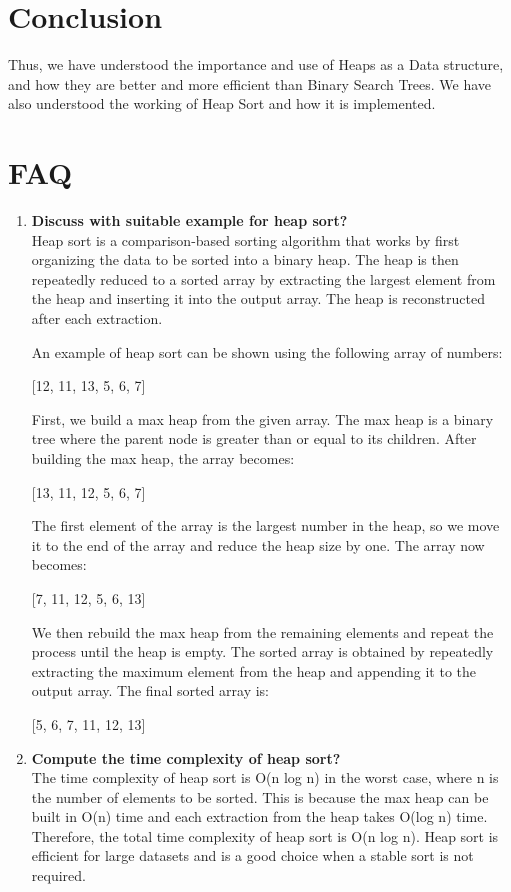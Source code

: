 \documentclass[11pt]{article}
\begin{document}


\section{Conclusion}
Thus, we have understood the importance and use of Heaps as a Data structure, and how they are better and more efficient than Binary Search Trees. We have also understood the working of Heap Sort and how it is implemented.

\clearpage

\section{FAQ}
\begin{enumerate}
    \item \textbf{Discuss with suitable example for heap sort?}\\
          Heap sort is a comparison-based sorting algorithm that works by first organizing the data to be sorted into a binary heap. The heap is then repeatedly reduced to a sorted array by extracting the largest element from the heap and inserting it into the output array. The heap is reconstructed after each extraction.

          An example of heap sort can be shown using the following array of numbers:

          [12, 11, 13, 5, 6, 7]

          First, we build a max heap from the given array. The max heap is a binary tree where the parent node is greater than or equal to its children. After building the max heap, the array becomes:

          [13, 11, 12, 5, 6, 7]

          The first element of the array is the largest number in the heap, so we move it to the end of the array and reduce the heap size by one. The array now becomes:

          [7, 11, 12, 5, 6, 13]

          We then rebuild the max heap from the remaining elements and repeat the process until the heap is empty. The sorted array is obtained by repeatedly extracting the maximum element from the heap and appending it to the output array. The final sorted array is:

          [5, 6, 7, 11, 12, 13]


    \item \textbf{Compute the time complexity of heap sort?}\\
          The time complexity of heap sort is O(n log n) in the worst case, where n is the number of elements to be sorted. This is because the max heap can be built in O(n) time and each extraction from the heap takes O(log n) time. Therefore, the total time complexity of heap sort is O(n log n). Heap sort is efficient for large datasets and is a good choice when a stable sort is not required.
\end{enumerate}
\end{document}
